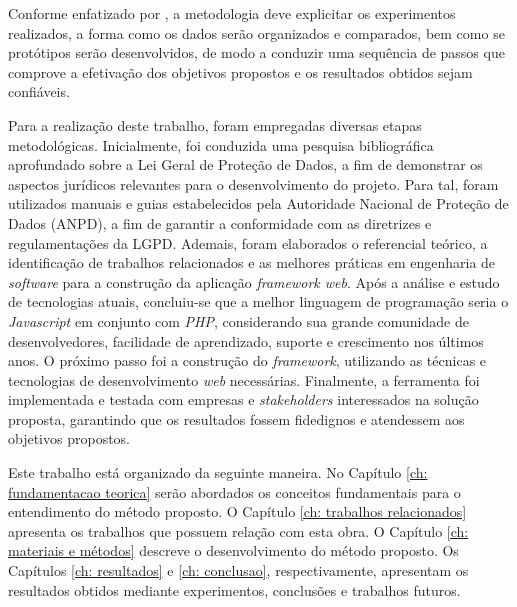 \documentclass[
	12pt,				%
	openright,			%
	oneside,			%
	a4paper,			%
	english,			%
	french,				%
	spanish,			%
	brazil,				%
	]{abntex2}
\begin{document}
Conforme enfatizado por , a metodologia deve explicitar os experimentos realizados, a forma como os dados serão organizados e comparados, bem como se protótipos serão desenvolvidos, de modo a conduzir uma sequência de passos que comprove a efetivação dos objetivos propostos e os resultados obtidos sejam confiáveis.


Para a realização deste trabalho, foram empregadas diversas etapas metodológicas. Inicialmente, foi conduzida uma pesquisa bibliográfica aprofundado sobre a Lei Geral de Proteção de Dados, a fim de demonstrar os aspectos jurídicos relevantes para o desenvolvimento do projeto.
Para tal, foram utilizados manuais e guias estabelecidos pela Autoridade Nacional de Proteção de Dados (ANPD), a fim de garantir a conformidade com as diretrizes e regulamentações da LGPD. Ademais, foram elaborados o referencial teórico, a identificação de trabalhos relacionados e as melhores práticas em engenharia de \textit{software} para a construção da aplicação \textit{framework web}.
Após a análise e estudo de tecnologias atuais, concluiu-se que a melhor linguagem de programação seria o \textit{Javascript} em conjunto com \textit{PHP}, considerando sua grande comunidade de desenvolvedores, facilidade de aprendizado, suporte e crescimento nos últimos anos.  
O próximo passo foi a construção do \textit{framework}, utilizando as técnicas e tecnologias de desenvolvimento \textit{web} necessárias. Finalmente, a ferramenta foi implementada e testada com empresas e \textit{stakeholders} interessados na solução proposta, garantindo que os resultados fossem fidedignos e atendessem aos objetivos propostos.
 




Este trabalho está organizado da seguinte maneira. No Capítulo \ref{ch: fundamentacao teorica} serão abordados os conceitos fundamentais para o entendimento do método proposto. O Capítulo \ref{ch: trabalhos relacionados} apresenta os trabalhos que possuem relação com esta obra. O Capítulo \ref{ch: materiais e métodos} descreve o desenvolvimento do método proposto. Os Capítulos \ref{ch: resultados} e \ref{ch: conclusao}, respectivamente, apresentam os resultados obtidos mediante experimentos, conclusões e trabalhos futuros.


\setcounter{chapter}{1}
\end{document}
